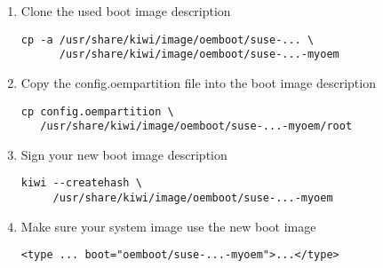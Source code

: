 \begin{enumerate}
\item Clone the used boot image description
\begin{verbatim}
cp -a /usr/share/kiwi/image/oemboot/suse-... \
      /usr/share/kiwi/image/oemboot/suse-...-myoem
\end{verbatim}
\item Copy the config.oempartition file into the boot image description 
\begin{verbatim}
cp config.oempartition \
   /usr/share/kiwi/image/oemboot/suse-...-myoem/root
\end{verbatim}
\item Sign your new boot image description
\begin{verbatim}
kiwi --createhash \
     /usr/share/kiwi/image/oemboot/suse-...-myoem
\end{verbatim}
\item Make sure your system image use the new boot image
\begin{verbatim}
<type ... boot="oemboot/suse-...-myoem">...</type>
\end{verbatim}
\end{enumerate}

